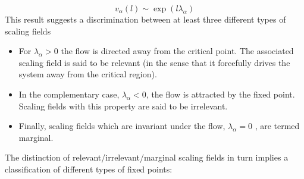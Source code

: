 \[v_{\alpha}(l) \sim \exp(l\lambda_{\alpha})\]
This result suggests a discrimination between at least three different types of scaling fields
\begin{itemize}
\item For $\lambda_{\alpha} > 0$ the flow is directed away from the critical point. The associated scaling field
is said to be relevant (in the sense that it forcefully drives the system away from the critical region).
\item In the complementary case, $\lambda_{\alpha} < 0$, the flow is attracted by the fixed point. Scaling fields
with this property are said to be irrelevant.
\item Finally, scaling fields which are invariant under the flow, $\lambda_{\alpha} = 0$ , are termed marginal.
\end{itemize}
The distinction of relevant/irrelevant/marginal scaling fields in turn implies a classification of different types of fixed points:
